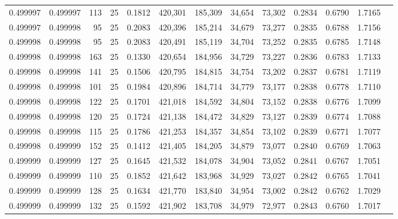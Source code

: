 \begin{tabular}{rrrrrrrrrrrrr}
0.499997 & 0.499997 &   113 &  25 &                                     0.1812 & 420,301 & 185,309 &  34,654 &  73,302 & 0.2834 & 0.6790 & 1.7165 \\
0.499997 & 0.499998 &    95 &  25 &                                     0.2083 & 420,396 & 185,214 &  34,679 &  73,277 & 0.2835 & 0.6788 & 1.7156 \\
0.499998 & 0.499998 &    95 &  25 &                                     0.2083 & 420,491 & 185,119 &  34,704 &  73,252 & 0.2835 & 0.6785 & 1.7148 \\
0.499998 & 0.499998 &   163 &  25 &                                     0.1330 & 420,654 & 184,956 &  34,729 &  73,227 & 0.2836 & 0.6783 & 1.7133 \\
0.499998 & 0.499998 &   141 &  25 &                                     0.1506 & 420,795 & 184,815 &  34,754 &  73,202 & 0.2837 & 0.6781 & 1.7119 \\
0.499998 & 0.499998 &   101 &  25 &                                     0.1984 & 420,896 & 184,714 &  34,779 &  73,177 & 0.2838 & 0.6778 & 1.7110 \\
0.499998 & 0.499998 &   122 &  25 &                                     0.1701 & 421,018 & 184,592 &  34,804 &  73,152 & 0.2838 & 0.6776 & 1.7099 \\
0.499998 & 0.499998 &   120 &  25 &                                     0.1724 & 421,138 & 184,472 &  34,829 &  73,127 & 0.2839 & 0.6774 & 1.7088 \\
0.499998 & 0.499998 &   115 &  25 &                                     0.1786 & 421,253 & 184,357 &  34,854 &  73,102 & 0.2839 & 0.6771 & 1.7077 \\
0.499998 & 0.499999 &   152 &  25 &                                     0.1412 & 421,405 & 184,205 &  34,879 &  73,077 & 0.2840 & 0.6769 & 1.7063 \\
0.499999 & 0.499999 &   127 &  25 &                                     0.1645 & 421,532 & 184,078 &  34,904 &  73,052 & 0.2841 & 0.6767 & 1.7051 \\
0.499999 & 0.499999 &   110 &  25 &                                     0.1852 & 421,642 & 183,968 &  34,929 &  73,027 & 0.2842 & 0.6765 & 1.7041 \\
0.499999 & 0.499999 &   128 &  25 &                                     0.1634 & 421,770 & 183,840 &  34,954 &  73,002 & 0.2842 & 0.6762 & 1.7029 \\
0.499999 & 0.499999 &   132 &  25 &                                     0.1592 & 421,902 & 183,708 &  34,979 &  72,977 & 0.2843 & 0.6760 & 1.7017 \\

\end{tabular}
